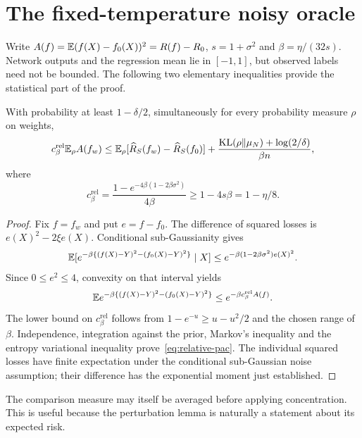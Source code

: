 \section{The fixed-temperature noisy oracle}
Write $A(f)=\mathbb E(f(X)-f_0(X))^2=R(f)-R_0$, $s=1+\sigma^2$ and $\beta=\eta/(32s)$. Network outputs and the regression mean lie in $[-1,1]$, but observed labels need not be bounded. The following two elementary inequalities provide the statistical part of the proof.

\begin{lemma}\label{lem:relative-pac}
With probability at least $1-\delta/2$, simultaneously for every probability measure $\rho$ on weights,
\begin{equation}
 c_\beta^{\mathrm{rel}}\mathbb E_\rho A(f_w)
 \le\mathbb E_\rho[\widehat R_S(f_w)-\widehat R_S(f_0)]
       +\frac{\operatorname{KL}(\rho\|\mu_N)+\log(2/\delta)}{\beta n},
 \label{eq:relative-pac}
\end{equation}
where
\[
 c_\beta^{\mathrm{rel}}=\frac{1-e^{-4\beta(1-2\beta\sigma^2)}}{4\beta}
       \ge1-4s\beta=1-\eta/8.
\]
\end{lemma}
\begin{proof}
Fix $f=f_w$ and put $e=f-f_0$. The difference of squared losses is $e(X)^2-2\xi e(X)$. Conditional sub-Gaussianity gives
\[
 \mathbb E[e^{-\beta\{(f(X)-Y)^2-(f_0(X)-Y)^2\}}\mid X]
 \le e^{-\beta(1-2\beta\sigma^2)e(X)^2}.
\]
Since $0\le e^2\le4$, convexity on that interval yields
\[
 \mathbb E e^{-\beta\{(f(X)-Y)^2-(f_0(X)-Y)^2\}}
 \le e^{-\beta c_\beta^{\mathrm{rel}} A(f)}.
\]
The lower bound on $c_\beta^{\mathrm{rel}}$ follows from $1-e^{-u}\ge u-u^2/2$ and the chosen range of $\beta$. Independence, integration against the prior, Markov's inequality and the entropy variational inequality prove~\eqref{eq:relative-pac}. The individual squared losses have finite expectation under the conditional sub-Gaussian noise assumption; their difference has the exponential moment just established.
\end{proof}

The comparison measure may itself be averaged before applying concentration. This is useful because the perturbation lemma is naturally a statement about its expected risk.

